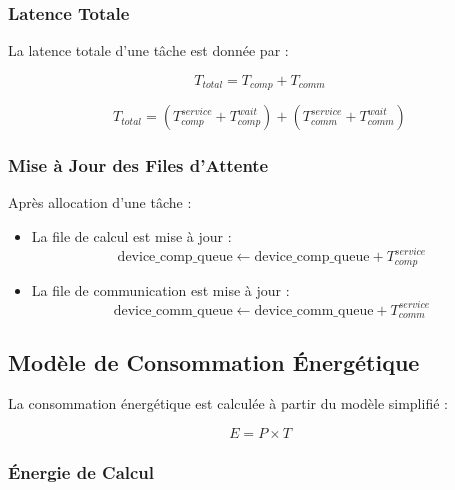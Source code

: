 \documentclass[12pt,a4paper]{article}
\begin{document}
\subsubsection{Latence Totale}

La latence totale d'une tâche est donnée par :

\begin{equation}
    T_{total} = T_{comp} + T_{comm}
\end{equation}

\begin{equation}
    T_{total} = (T_{comp}^{service} + T_{comp}^{wait}) + (T_{comm}^{service} + T_{comm}^{wait})
\end{equation}

 

\subsubsection{Mise à Jour des Files d’Attente}

Après allocation d'une tâche :

\begin{itemize}
    \item La file de calcul est mise à jour :
    \begin{equation}
        \text{device\_comp\_queue} \leftarrow \text{device\_comp\_queue} + T_{comp}^{service}
    \end{equation}

    \item La file de communication est mise à jour :
    \begin{equation}
        \text{device\_comm\_queue} \leftarrow \text{device\_comm\_queue} + T_{comm}^{service}
    \end{equation}
\end{itemize}

 

\subsection{Modèle de Consommation Énergétique}

La consommation énergétique est calculée à partir du modèle simplifié :

\begin{equation}
    E = P \times T
\end{equation}

\subsubsection{Énergie de Calcul}
\end{document}

